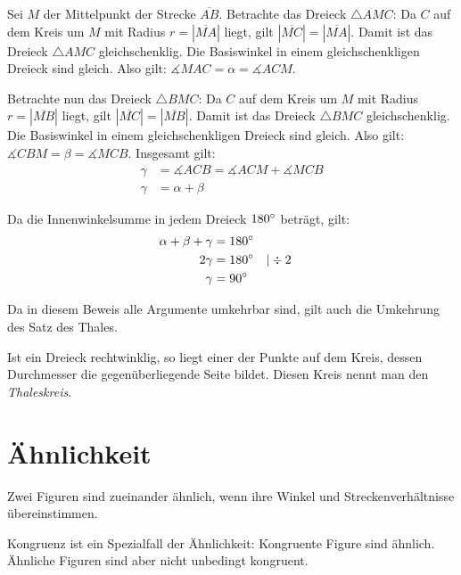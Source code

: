 \begin{bew}
 Sei \(M\) der Mittelpunkt der Strecke \(\overline{AB}\). Betrachte das Dreieck \(\triangle AMC\): Da \(C\) auf dem Kreis um \(M\) mit Radius \(r=\left|\overline{MA}\right|\) liegt, gilt \(\left|\overline{MC}\right|=\left|\overline{MA}\right|\). Damit ist das Dreieck \(\triangle AMC\) gleichschenklig. Die Basiswinkel in einem gleichschenkligen Dreieck sind gleich. Also gilt: \(\measuredangle MAC = \alpha = \measuredangle ACM\).
 
 Betrachte nun das Dreieck \(\triangle BMC\): Da \(C\) auf dem Kreis um \(M\) mit Radius \(r=\left|\overline{MB}\right|\) liegt, gilt \(\left|\overline{MC}\right|=\left|\overline{MB}\right|\). Damit ist das Dreieck \(\triangle BMC\) gleichschenklig. Die Basiswinkel in einem gleichschenkligen Dreieck sind gleich. Also gilt: \(\measuredangle CBM = \beta = \measuredangle MCB\). Insgesamt gilt:
 \begin{align*}
  \gamma &= \measuredangle ACB = \measuredangle ACM + \measuredangle MCB\\
  \gamma &= \alpha + \beta
 \end{align*}
 
 Da die Innenwinkelsumme in jedem Dreieck \(180\degree\) beträgt, gilt:
 \begin{align*}
  \alpha + \beta + \gamma &= 180\degree\\
  2 \gamma &= 180\degree &&|\div 2\\
  \gamma &= 90\degree  
 \end{align*}
\end{bew}

Da in diesem Beweis alle Argumente umkehrbar sind, gilt auch die Umkehrung des Satz des Thales.

\begin{satz}
 Ist ein Dreieck rechtwinklig, so liegt einer der Punkte auf dem Kreis, dessen Durchmesser die gegenüberliegende Seite bildet. Diesen Kreis nennt man den \emph{Thaleskreis}. 
\end{satz}

\section{Ähnlichkeit}

\begin{defi}[Ähnlichkeit]
 Zwei Figuren sind zueinander ähnlich, wenn ihre Winkel und Streckenverhältnisse übereinstimmen.
 
 Kongruenz ist ein Spezialfall der Ähnlichkeit: Kongruente Figure sind ähnlich. Ähnliche Figuren sind aber nicht unbedingt kongruent.
\end{defi}

